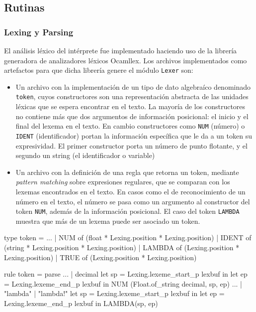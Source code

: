 \subsection{Rutinas}

\subsubsection{Lexing y Parsing}

El análisis léxico del intérprete fue implementado haciendo uso de la
librería generadora de analizadores léxicos Ocamllex. Los
archivos implementados como artefactos para que dicha librería genere
el módulo \verb|Lexer| son:
\begin{itemize}
\item Un archivo con la implementación de un tipo de dato algebraíco
  denominado \verb|token|, cuyos constructores son una representación
  abstracta de las unidades léxicas que se espera encontrar en el
  texto. La mayoría de los constructores no contiene más que dos
  argumentos de información posicional: el inicio y el final del
  lexema en el texto. En cambio constructores como \verb|NUM| (número) o
  \verb|IDENT| (identificador) portan la información específica que le da
  a un token su expresividad. El primer constructor porta un número de punto
  flotante, y el segundo un string (el identificador o variable)
\item Un archivo con la definición de una regla que retorna un token,
  mediante \emph{pattern matching} sobre expresiones regulares, que se
  comparan con los lexemas encontrados en el texto. En casos como el de
  reconocimiento de un número en el texto, el número se pasa como un argumento
  al constructor del token \verb|NUM|, además de la información posicional.
  El caso del token \verb|LAMBDA| muestra que más de un lexema puede ser asociado
  un token.
\end{itemize}

\begin{ocamlblock}[caption={Implementación de \texttt{token} y reconocimiento de lexemas},label={lst:imp-parse}]
  type token =
  ...
  | NUM        of (float  * Lexing.position * Lexing.position)
  | IDENT      of (string * Lexing.position * Lexing.position)
  | LAMBDA     of (Lexing.position * Lexing.position)
  | TRUE       of (Lexing.position * Lexing.position)

  rule token = parse
  ...
  | decimal {
    let sp = Lexing.lexeme_start_p lexbuf in
    let ep = Lexing.lexeme_end_p   lexbuf in
    NUM (Float.of_string decimal, sp, ep)
  }
  ...
  | "lambda" | "lambda!" { 
    let sp = Lexing.lexeme_start_p lexbuf in
    let ep = Lexing.lexeme_end_p   lexbuf in
    LAMBDA(sp, ep)
  }
\end{ocamlblock}

